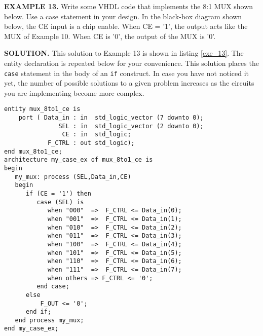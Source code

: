 \begin{leftbar}
\begin{minipage}{0.5\linewidth}
\noindent
\textbf{EXAMPLE 13.}
Write some VHDL code that implements the 8:1 MUX shown below. Use a case statement in your design. In the black-box diagram shown below, the CE input is a chip enable. When CE = '1', the output acts like the MUX of Example 10. When CE is '0', the output of the MUX is '0'.
\end{minipage}
\begin{minipage}{0.47\linewidth}
\begin{flushright}
\end{flushright}
\end{minipage}
\end{leftbar}
\noindent
\textbf{SOLUTION.} This solution to Example 13 is shown in listing \ref{exe_13}. The entity declaration is repeated below for your convenience. This solution places the \texttt{case} statement in the body of an \texttt{if} construct. In case you have not noticed it yet, the number of possible solutions to a given problem increases as the circuits you are implementing become more complex.
\begin{lstlisting}[label=exe_13, caption=Solution to Example 13.]
entity mux_8to1_ce is
    port ( Data_in : in  std_logic_vector (7 downto 0);
               SEL : in  std_logic_vector (2 downto 0);
                CE : in  std_logic;
            F_CTRL : out std_logic);  
end mux_8to1_ce;
architecture my_case_ex of mux_8to1_ce is 
begin
   my_mux: process (SEL,Data_in,CE)
   begin
      if (CE = '1') then 
         case (SEL) is 
            when "000"  =>  F_CTRL <= Data_in(0); 
            when "001"  =>  F_CTRL <= Data_in(1); 
            when "010"  =>  F_CTRL <= Data_in(2); 
            when "011"  =>  F_CTRL <= Data_in(3); 
            when "100"  =>  F_CTRL <= Data_in(4); 
            when "101"  =>  F_CTRL <= Data_in(5); 
            when "110"  =>  F_CTRL <= Data_in(6); 
            when "111"  =>  F_CTRL <= Data_in(7); 
            when others => F_CTRL <= '0'; 
         end case; 
      else
          F_OUT <= '0'; 
      end if; 
   end process my_mux; 
end my_case_ex;
\end{lstlisting}

